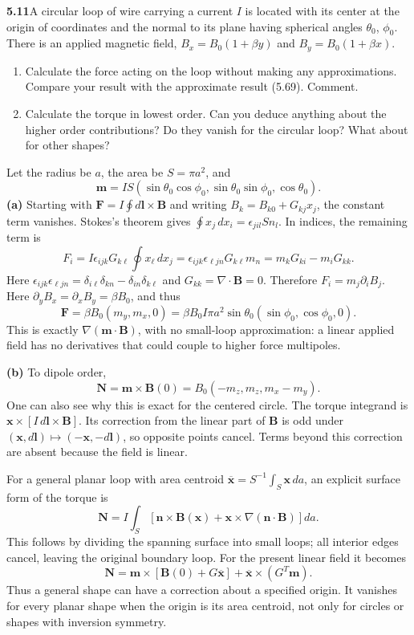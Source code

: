 \par\bigskip
\noindent\textbf{5.11}\quad A circular loop of wire carrying a current $I$ is located with its center at the origin of coordinates and the normal to its plane having spherical angles $\theta_{0}$, $\phi_{0}$. There is an applied magnetic field, $B_{x}=B_{0}(1+\beta y)$ and $B_{y}=B_{0}(1+\beta x)$.
\begin{enumerate}
\item[(a)] Calculate the force acting on the loop without making any approximations. Compare your result with the approximate result (5.69). Comment.
\item[(b)] Calculate the torque in lowest order. Can you deduce anything about the higher order contributions? Do they vanish for the circular loop? What about for other shapes?
\end{enumerate}
\solution
Let the radius be $a$, the area be $S=\pi a^2$, and
\[
\mathbf m=IS(\sin\theta_0\cos\phi_0,\sin\theta_0\sin\phi_0,\cos\theta_0).
\]
\textbf{(a)} Starting with
$\mathbf F=I\oint d\mathbf l\times\mathbf B$ and writing
$B_k=B_{k0}+G_{kj}x_j$, the constant term vanishes.
Stokes's theorem gives
$\oint x_j\,dx_i=\epsilon_{jil}S n_l$.
In indices, the remaining term is
\[
F_i=I\epsilon_{ijk}G_{k\ell}\oint x_\ell\,dx_j
=\epsilon_{ijk}\epsilon_{\ell jn}G_{k\ell}m_n
=m_kG_{ki}-m_iG_{kk}.
\]
Here $\epsilon_{ijk}\epsilon_{\ell jn}=\delta_{i\ell}\delta_{kn}
-\delta_{in}\delta_{k\ell}$ and $G_{kk}=\nabla\cdot\mathbf B=0$.
Therefore $F_i=m_j\partial_iB_j$.
Here $\partial_yB_x=\partial_xB_y=\beta B_0$, and thus
\[
\boxed{\mathbf F=\beta B_0(m_y,m_x,0)
=\beta B_0I\pi a^2\sin\theta_0
(\sin\phi_0,\cos\phi_0,0).}
\]
This is exactly $\nabla(\mathbf m\cdot\mathbf B)$, with no small-loop
approximation: a linear applied field has no derivatives that could
couple to higher force multipoles.

\textbf{(b)} To dipole order,
\[
\boxed{\mathbf N=\mathbf m\times\mathbf B(0)
=B_0(-m_z,m_z,m_x-m_y).}
\]
One can also see why this is exact for the centered circle. The torque
integrand is $\mathbf x\times[I\,d\mathbf l\times\mathbf B]$.
Its correction from the linear part of $\mathbf B$ is odd under
$(\mathbf x,d\mathbf l)\mapsto(-\mathbf x,-d\mathbf l)$, so opposite
points cancel. Terms beyond this correction are absent because the field
is linear.

For a general planar loop with area centroid
$\overline{\mathbf x}=S^{-1}\int_S\mathbf x\,da$, an explicit surface
form of the torque is
\[
\mathbf N=I\int_S\left[\mathbf n\times\mathbf B(\mathbf x)
+\mathbf x\times\nabla(\mathbf n\cdot\mathbf B)\right]da.
\]
This follows by dividing the spanning surface into small loops; all
interior edges cancel, leaving the original boundary loop.
For the present linear field it becomes
\[
\mathbf N=\mathbf m\times[\mathbf B(0)+G\overline{\mathbf x}]
+\overline{\mathbf x}\times(G^T\mathbf m).
\]
Thus a general shape can have a correction about a specified origin.
It vanishes for every planar shape when the origin is its area centroid,
not only for circles or shapes with inversion symmetry.


